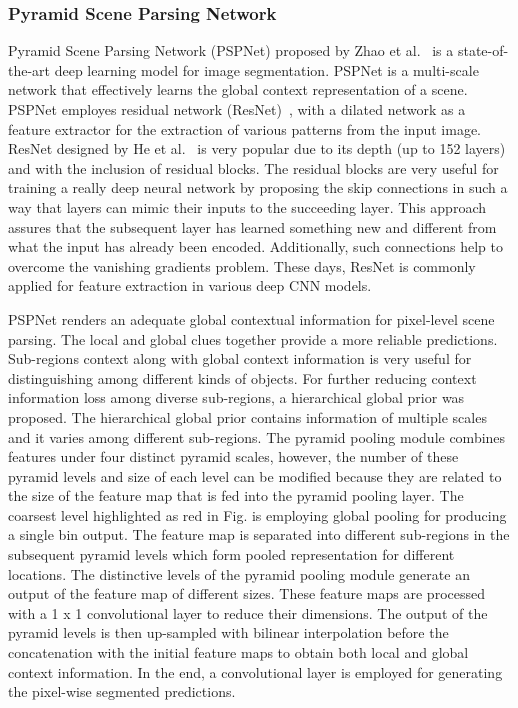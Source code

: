 \subsubsection{Pyramid Scene Parsing Network}
	Pyramid Scene Parsing Network (PSPNet) proposed by Zhao et al.~\cite{zhao2017pyramid} is a state-of-the-art deep learning model for image segmentation. PSPNet is a multi-scale network that effectively learns the global context representation of a scene. PSPNet employes residual network (ResNet)~\cite{he2016deep}, with a dilated network as a feature extractor for the extraction of various patterns from the input image. ResNet designed by He et al.~\cite{he2016deep} is very popular due to its depth (up to 152 layers) and with the inclusion of residual blocks. The residual blocks are very useful for training a really deep neural network by proposing the skip connections in such a way that layers can mimic their inputs to the succeeding layer. 
	This approach assures that the subsequent layer has learned something new and different from what the input has already been encoded. Additionally, such connections help to overcome the vanishing gradients problem. These days, ResNet is commonly applied for feature extraction in various deep CNN models. 
	
	PSPNet renders an adequate global contextual information for pixel-level scene parsing. The local and global clues together provide a more reliable predictions. Sub-regions context along with global context information is very useful for distinguishing among different kinds of objects. For further reducing context information loss among diverse sub-regions, a hierarchical global prior was proposed. The hierarchical global prior contains information of multiple scales and it varies among different sub-regions. The pyramid pooling module combines features under four distinct pyramid scales, however, the number of these pyramid levels and size of each level can be modified because they are related to the size of the feature map that is fed into the pyramid pooling layer. The coarsest level highlighted as red in Fig. is employing global pooling for producing a single bin output. The feature map is separated into different sub-regions in the subsequent pyramid levels which form pooled representation for different locations. The distinctive levels of the pyramid pooling module generate an output of the feature map of different sizes. These feature maps are processed with a 1 x 1 convolutional layer to reduce their dimensions. The output of the pyramid levels is then up-sampled with bilinear interpolation before the concatenation with the initial feature maps to obtain both local and global context information. In the end, a convolutional layer is employed for generating the pixel-wise segmented predictions. 
	
